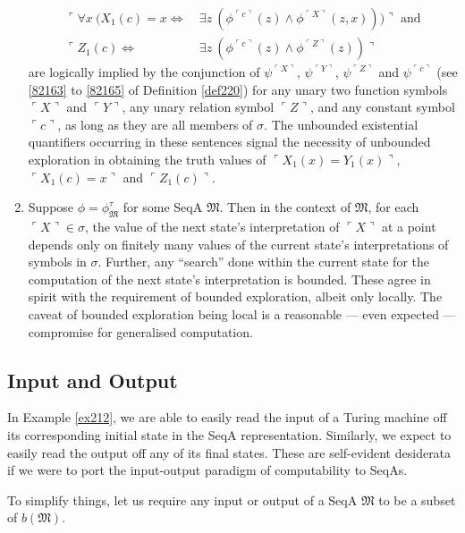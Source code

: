 \documentclass[12pt, twoside]{memoir}
\numberwithin{equation}{section}
\theoremstyle{definition}
\theoremstyle{remark}
\theoremstyle{definition}
\theoremstyle{definition}
\theoremstyle{definition}
\theoremstyle{remark}
\begin{document}
\begin{enumerate}[label=(C\arabic*)]
\begin{align*}
        \ulcorner \forall x \ (X_1(c) = x \iff & \ \exists z \ (\phi^{\ulcorner c \urcorner}(z) \wedge \phi^{\ulcorner X \urcorner}(z, x))) \urcorner \text{ and} \\
        \ulcorner Z_1(c) \iff & \ \exists z \ (\phi^{\ulcorner c \urcorner}(z) \wedge \phi^{\ulcorner Z \urcorner}(z)) \urcorner
    \end{align*}
    are logically implied by the conjunction of $\psi^{\ulcorner X \urcorner}$, $\psi^{\ulcorner Y \urcorner}$, $\psi^{\ulcorner Z \urcorner}$ and $\psi^{\ulcorner c \urcorner}$ (see \ref{82163} to \ref{82165} of Definition \ref{def220}) for any unary two function symbols $\ulcorner X \urcorner$ and $\ulcorner Y \urcorner$, any unary relation symbol $\ulcorner Z \urcorner$, and any constant symbol $\ulcorner c \urcorner$, as long as they are all members of $\sigma$. The unbounded existential quantifiers occurring in these sentences signal the necessity of unbounded exploration in obtaining the truth values of $\ulcorner X_1(x) = Y_1(x) \urcorner$, $\ulcorner X_1(c) = x \urcorner$ and $\ulcorner Z_1(c) \urcorner$. 
    \item Suppose $\phi = \phi^{\tau}_{\mathfrak{M}}$ for some SeqA $\mathfrak{M}$. Then in the context of $\mathfrak{M}$, for each $\ulcorner X \urcorner \in \sigma$, the value of the next state's interpretation of $\ulcorner X \urcorner$ at a point depends only on finitely many values of the current state's interpretations of symbols in $\sigma$. Further, any ``search'' done within the current state for the computation of the next state's interpretation is bounded. These agree in spirit with the requirement of bounded exploration, albeit only locally. The caveat of bounded exploration being local is a reasonable --- even expected --- compromise for generalised computation.
\end{enumerate}

\subsection{Input and Output}\label{ss250}

In Example \ref{ex212}, we are able to easily read the input of a Turing machine off its corresponding initial state in the SeqA representation. Similarly, we expect to easily read the output off any of its final states. These are self-evident desiderata if we were to port the input-output paradigm of computability to SeqAs. 

To simplify things, let us require any input or output of a SeqA $\mathfrak{M}$ to be a subset of $b(\mathfrak{M})$.
\end{document}

